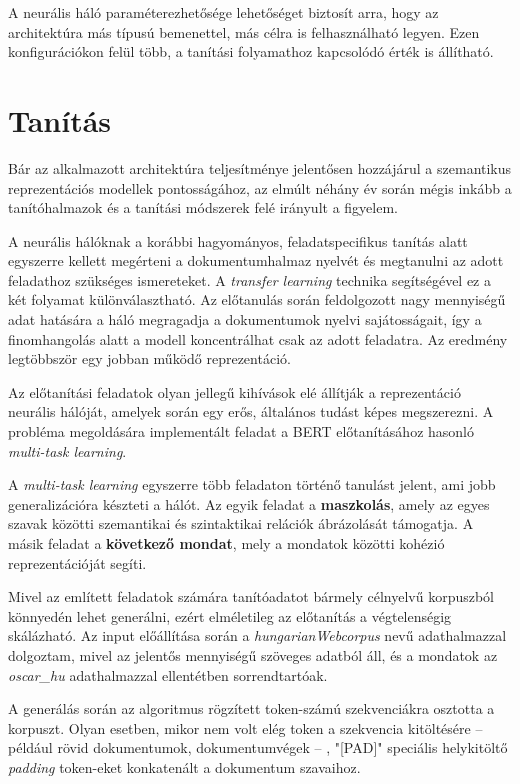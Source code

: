 A neurális háló paraméterezhetősége lehetőséget biztosít arra, hogy az architektúra más típusú bemenettel, más célra is felhasználható legyen. Ezen konfigurációkon felül több, a tanítási folyamathoz kapcsolódó érték is állítható.

\section{Tanítás}

Bár az alkalmazott architektúra teljesítménye jelentősen hozzájárul a szemantikus reprezentációs modellek pontosságához, az elmúlt néhány év során mégis inkább a tanítóhalmazok és a tanítási módszerek felé irányult a figyelem.

A neurális hálóknak a korábbi hagyományos, feladatspecifikus tanítás alatt egyszerre kellett megérteni a dokumentumhalmaz nyelvét és megtanulni az adott feladathoz szükséges ismereteket. A \textit{transfer learning} technika segítségével ez a két folyamat különválasztható. Az előtanulás során feldolgozott nagy mennyiségű adat hatására a háló megragadja a dokumentumok nyelvi sajátosságait, így a finomhangolás alatt a modell koncentrálhat csak az adott feladatra. Az eredmény legtöbbször egy jobban működő reprezentáció.

Az előtanítási feladatok olyan jellegű kihívások elé állítják a reprezentáció neurális hálóját, amelyek során egy erős, általános tudást képes megszerezni. A probléma megoldására implementált feladat a BERT előtanításához hasonló \textit{multi-task learning}. 

A \textit{multi-task learning} egyszerre több feladaton történő tanulást jelent, ami jobb generalizációra készteti a hálót. Az egyik feladat a \textbf{maszkolás}, amely az egyes szavak közötti szemantikai és szintaktikai relációk ábrázolását támogatja. A másik feladat a \textbf{következő mondat}, mely a mondatok közötti kohézió reprezentációját segíti.

Mivel az említett feladatok számára tanítóadatot bármely célnyelvű korpuszból könnyedén lehet generálni, ezért elméletileg az előtanítás a végtelenségig skálázható. Az input előállítása során a \textit{hungarianWebcorpus} nevű adathalmazzal dolgoztam, mivel az jelentős mennyiségű szöveges adatból áll, és a mondatok az \textit{oscar\_hu} adathalmazzal ellentétben sorrendtartóak.

A generálás során az algoritmus rögzített token-számú szekvenciákra osztotta a korpuszt. Olyan esetben, mikor nem volt elég token a szekvencia kitöltésére – például rövid dokumentumok, dokumentumvégek – , "[PAD]" speciális helykitöltő \textit{padding} token-eket konkatenált a dokumentum szavaihoz. 
 
